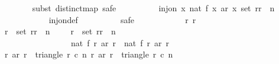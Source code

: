 \begin{isabellebody}
\ \ \ \ \ \ \isamarkupfalse%
\ {\isacharparenleft}subst\ distinct{\isacharunderscore}map{\isacharcomma}\ safe{\isacharparenright}\isanewline
\ \ \ \ \ \ \ \ \isamarkupfalse%
\ {\isachardoublequoteopen}inj{\isacharunderscore}on\ {\isacharparenleft}{\isasymlambda}x{\isachardot}\ nat\ {\isacharparenleft}f\ x\ {\isacharparenleft}ar\ x{\isacharparenright}{\isacharparenright}{\isacharparenright}\ {\isacharparenleft}set\ {\isacharbrackleft}r{}{\isachardot}{\isachardot}{\isacharless}{\isacharparenleft}r{}\ {\isacharplus}\ n\ {\isacharminus}\ {}{\isacharparenright}\ {\isacharplus}\ {}{\isacharbrackright}{\isacharparenright}{\isachardoublequoteclose}\isanewline
\ \ \ \ \ \ \ \ \ \ \isamarkupfalse%
\ inj{\isacharunderscore}on{\isacharunderscore}def\isanewline
\ \ \ \ \ \ \ \ \isamarkupfalse%
\ safe\isanewline
\ \ \ \ \ \ \ \ \ \ \isamarkupfalse%
\ r{}\ r{}\isanewline
\ \ \ \ \ \ \ \ \ \ \isamarkupfalse%
\ {\isachardoublequoteopen}r{}\ {\isasymin}\ set\ {\isacharbrackleft}r{}{\isachardot}{\isachardot}{\isacharless}{\isacharparenleft}r{}\ {\isacharplus}\ n\ {\isacharminus}\ {}{\isacharparenright}\ {\isacharplus}\ {}{\isacharbrackright}{\isachardoublequoteclose}\ {\isachardoublequoteopen}r{}\ {\isasymin}\ set\ {\isacharbrackleft}r{}{\isachardot}{\isachardot}{\isacharless}{\isacharparenleft}r{}\ {\isacharplus}\ n\ {\isacharminus}\ {}{\isacharparenright}\ {\isacharplus}\ {}{\isacharbrackright}{\isachardoublequoteclose}\isanewline
\ \ \ \ \ \ \ \ \ \ \ \ \ \ \ \ \ {\isachardoublequoteopen}nat\ {\isacharparenleft}f\ r{}\ {\isacharparenleft}ar\ r{}{\isacharparenright}{\isacharparenright}\ {\isacharequal}\ nat\ {\isacharparenleft}f\ r{}\ {\isacharparenleft}ar\ r{}{\isacharparenright}{\isacharparenright}{\isachardoublequoteclose}\isanewline
\ \ \ \ \ \ \ \ \ \ \isamarkupfalse%
\ {\isachardoublequoteopen}{\isacharparenleft}r{}{\isacharcomma}\ ar\ r{}{\isacharparenright}\ {\isasymin}\ triangle\ r{}\ c{}\ n{\isachardoublequoteclose}\ {\isachardoublequoteopen}{\isacharparenleft}r{}{\isacharcomma}\ ar\ r{}{\isacharparenright}\ {\isasymin}\ triangle\ r{}\ c{}\ n{\isachardoublequoteclose}\isanewline
\ \ \ \ \ \ \ \ \ \ \ \ \isamarkupfalse%

\end{isabellebody}
